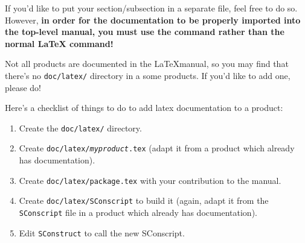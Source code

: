If you'd like to put your section/subsection in a separate \tttex
file, feel free to do so.  However, {\bfseries in order for the
  documentation to be properly imported into the top-level manual, you
  must use the \ttlsstinput command rather than the normal \LaTeX
  \ttinput command!}

Not all products are documented in the \LaTeX manual, so you may find
that there's no \texttt{doc/latex/} directory in a some products.  If
you'd like to add one, please do!

Here's a checklist of things to do to add latex documentation to a product:

\begin{enumerate}
  \item Create the \texttt{doc/latex/} directory.
  \item Create \texttt{doc/latex/{\itshape myproduct}.tex} (adapt it
    from a product which already has documentation).
  \item Create \texttt{doc/latex/package.tex} with your contribution to the manual.
  \item Create \texttt{doc/latex/SConscript} to build it (again, adapt
    it from the \texttt{SConscript} file in a product which already
    has documentation).
  \item Edit \texttt{SConstruct} to call the new SConscript.
\end{enumerate}

